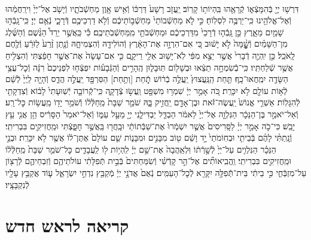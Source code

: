 \documentclass[twoside, openany, parskip=half, 11pt]{book}
\begin{document}
\begin{sometimes}
\begin{footnotesize}
\begin{multicols}{2}
\\
דִּרְשׁ֥וּ יְיָ֖ בְּֿהִמָּצְֿא֑וֹ קְֿרָאֻ֖הוּ בִּֽהְיוֹת֥וֹ קָרֽוֹב׃ יַֽעֲזֹ֤ב רָשָׁע֙ דַּרְכּ֔וֹ וְֿאִ֥ישׁ אָ֖וֶן מַחְשְֿׁבֹתָ֑יו וְֿיָשֹׁ֤ב אֶל־יְיָ֙ וִירַֽחֲמֵ֔הוּ וְֿאֶל־אֱלֹהֵ֖ינוּ כִּֽי־יַרְבֶּ֥ה לִסְלֽוֹחַ׃ כִּ֣י לֹ֤א מַחְשְֿׁבוֹתַי֙ מַחְשְֿׁב֣וֹתֵיכֶ֔ם וְֿלֹ֥א דַרְכֵיכֶ֖ם דְּֿרָכָ֑י נְֿאֻ֖ם יְיָ׃ כִּֽי־גָֽבְֿה֥וּ שָׁמַ֖יִם מֵאָ֑רֶץ כֵּ֣ן גָּֽבְֿה֤וּ דְֿרָכַי֙ מִדַּרְכֵיכֶ֔ם וּמַחְשְֿׁבֹתַ֖י מִֽמַּחְשְֿׁבֹֽתֵיכֶֽם׃ כִּ֡י כַּֽאֲשֶׁ֣ר יֵרֵד֩ הַגֶּ֨שֶׁם וְֿהַשֶּׁ֜לֶג מִן־הַשָּׁמַ֗יִם וְֿשׇׇׇׇׇׇׇׇָׁ֨מָּה֙ לֹ֣א יָשׁ֔וּב כִּ֚י אִם־הִרְוָ֣ה אֶת־הָאָ֔רֶץ וְֿהוֹלִידָ֖הּ וְֿהִצְמִיחָ֑הּ וְֿנָ֤תַן זֶ֨רַע֙ לַזֹּרֵ֔עַ וְֿלֶ֖חֶם לָֽאֹכֵֽל׃ כֵּ֣ן יִֽהְיֶ֤ה דְֿבָרִי֙ אֲשֶׁ֣ר יֵצֵ֣א מִפִּ֔י לֹֽא־יָשׁ֥וּב אֵלַ֖י רֵיקָ֑ם כִּ֤י אִם־עָשָׂה֙ אֶת־אֲשֶׁ֣ר חָפַ֔צְתִּי וְֿהִצְלִ֖יחַ אֲשֶׁ֥ר שְֿׁלַחְתִּֽיו׃ כִּֽי־בְֿֿשִׂמְחָ֣ה תֵצֵ֔אוּ וּבְשָׁל֖וֹם תּֽוּבָל֑וּן הֶֽהָרִ֣ים וְֿהַגְּֿבָע֗וֹת יִפְצְֿח֤וּ לִפְנֵיכֶם֙ רִנָּ֔ה וְֿכׇל־עֲצֵ֥י הַשָּׂדֶ֖ה יִמְֽחֲאוּ־כָֽף׃ תַּ֤חַת הַֽנַּֽעֲצוּץ֙ יַֽעֲלֶ֣ה בְֿר֔וֹשׁ תְַֿ֥חַת [וְתַ֥חַת] הַסִּרְפָּ֖ד יַֽעֲלֶ֣ה הֲדַ֑ס וְֿהָיָ֤ה לַֽיְיָ֙ לְֿשֵׁ֔ם לְֿא֥וֹת עוֹלָ֖ם לֹ֥א יִכָּרֵֽת׃ כֹּ֚ה אָמַ֣ר יְיָ֔ שִׁמְר֥וּ מִשְׁפָּ֖ט וַֽעֲשׂ֣וּ צְֿדָקָ֑ה כִּֽי־קְֿֿרוֹבָ֤ה יְֿשֽׁוּעָתִי֙ לָב֔וֹא וְֿצִדְקָתִ֖י לְֿהִגָּלֽוֹת׃ אַשְׁרֵ֤י אֱנוֹשׁ֙ יַֽעֲשֶׂה־זֹּ֔את וּבֶן־אָדָ֖ם יַֽחֲזִ֣יק בָּ֑הּ שֹׁמֵ֤ר שַׁבָּת֙ מֵֽחַלְּֿל֔וֹ וְֿשֹׁמֵ֥ר יָד֖וֹ מֵֽעֲשׂ֥וֹת כׇּל־רָֽע׃ וְֿאַל־יֹאמַ֣ר בֶּן־הַנֵּכָ֔ר הַנִּלְוָ֤ה אֶל־יְיָ֙ לֵאמֹ֔ר הַבְדֵּ֧ל יַבְדִּילַ֛נִי יְיָ֖ מֵעַ֣ל עַמּ֑וֹ וְֿאַל־יֹאמַר֙ הַסָּרִ֔יס הֵ֥ן אֲנִ֖י עֵ֥ץ יָבֵֽשׁ׃ כִּי־כֹ֣ה אָמַ֣ר יְיָ֗ לַסָּֽרִיסִים֙ אֲשֶׁ֤ר יִשְׁמְֿרוּ֙ אֶת־שַׁבְּֿתוֹתַ֔י וּבָֽחֲר֖וּ בַּֽאֲשֶׁ֣ר חָפָ֑צְֿתִּי וּמַֽחֲזִיקִ֖ים בִּבְרִיתִֽי׃ וְֿנָֽתַתִּ֨י לָהֶ֜ם בְּֿבֵיתִ֤י וּבְחֽוֹמֹתַי֙ יָ֣ד וָשֵׁ֔ם ט֖וֹב מִבָּנִ֣ים וּמִבָּנ֑וֹת שֵׁ֤ם עוֹלָם֙ אֶתֶּן־ל֔וֹ אֲשֶׁ֖ר לֹ֥א יִכָּרֵֽת׃ וּבְנֵ֣י הַנֵּכָ֗ר הַנִּלְוִ֤ים עַל־יְיָ֙ לְֿשָׁ֣רְֿת֔וֹ וּֽלְאַֽהֲבָה֙ אֶת־שֵׁ֣ם יְיָ֔ לִֽהְי֥וֹת ל֖וֹ לַֽעֲבָדִ֑ים כׇּל־שֹׁמֵ֤ר שַׁבָּת֙ מֵֽחַלְּֿל֔וֹ וּמַֽחֲזִיקִ֖ים בִּבְרִיתִֽי׃ וַֽהֲבִֽיאוֹתִ֞ים אֶל־הַ֣ר קָדְֿשִׁ֗י וְֿשִׂמַּחְתִּים֙ בְּֿבֵ֣ית תְּֿפִלָּתִ֔י עוֹלֹתֵיהֶ֧ם וְֿזִבְחֵיהֶ֛ם לְֿרָצ֖וֹן עַל־מִזְבְּֿחִ֑י כִּ֣י בֵיתִ֔י בֵּית־תְּֿֿפִלָּ֥ה יִקָּרֵ֖א לְֿכׇל־הָעַמִּֽים׃ נְֿאֻם֙ אֲדֹנָ֣י יְיָ֔ מְֿקַבֵּ֖ץ נִדְחֵ֣י יִשְׂרָאֵ֑ל ע֛וֹד אֲקַבֵּ֥ץ עָלָ֖יו לְֿנִקְבָּצָֽיו׃

\end{multicols}

\section[ראש חדש]{קריאה לראש חדש}



\end{footnotesize}
\end{sometimes}
\end{document}
